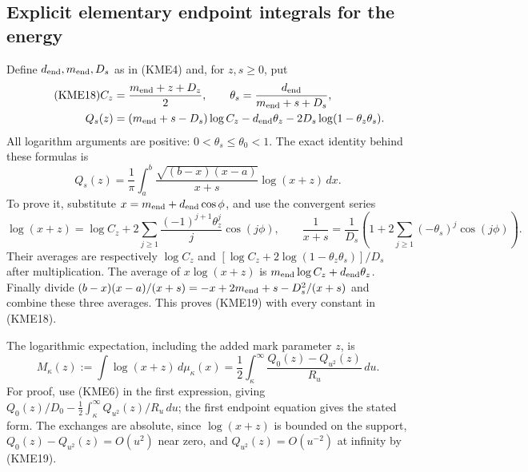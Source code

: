 \documentclass[11pt,a4paper]{article}
\begin{document}
\subsection{Explicit elementary endpoint integrals for the energy}
Define $d_{\rm end},m_{\rm end},D_s$ as in (KME4) and, for $z,s\geq0$, put
\begin{align}\tag{KME18}
 C_z&=\frac{m_{\rm end}+z+D_z}{2},\qquad
 \theta_s=\frac{d_{\rm end}}{m_{\rm end}+s+D_s},\\
 Q_s(z)&=(m_{\rm end}+s-D_s)\log C_z-d_{\rm end}\theta_z
                         -2D_s\log(1-\theta_z\theta_s).
 \notag
\end{align}
All logarithm arguments are positive: $0<\theta_s\leq\theta_0<1$.
The exact identity behind these formulas is
\begin{equation}\tag{KME19}
 Q_s(z)=\frac1\pi\int_a^b
          \frac{\sqrt{(b-x)(x-a)}}{x+s}\log(x+z)\,dx.
\end{equation}
To prove it, substitute $x=m_{\rm end}+d_{\rm end}\cos\phi$, and use the convergent series
\[
 \log(x+z)=\log C_z+
       2\sum_{j\geq1}\frac{(-1)^{j+1}\theta_z^j}{j}\cos(j\phi),
 \qquad
 \frac1{x+s}=\frac1{D_s}
       \left(1+2\sum_{j\geq1}(-\theta_s)^j\cos(j\phi)\right).
\]
Their averages are respectively $\log C_z$ and
$[\log C_z+2\log(1-\theta_z\theta_s)]/D_s$ after multiplication.
The average of $x\log(x+z)$ is $m_{\rm end}\log C_z+d_{\rm end}\theta_z$.
Finally divide
$(b-x)(x-a)/(x+s)=-x+2m_{\rm end}+s-D_s^2/(x+s)$ and combine these three
averages. This proves (KME19) with every constant in (KME18).

The logarithmic expectation, including the added mark parameter $z$, is
\begin{equation}\tag{KME20}
 M_\kappa(z):=\int\log(x+z)\,d\mu_\kappa(x)
       =\frac12\int_\kappa^\infty
                    \frac{Q_0(z)-Q_{u^2}(z)}{R_u}\,du.
\end{equation}
For proof, use (KME6) in the first expression, giving
$Q_0(z)/D_0-\tfrac12\int_\kappa^\infty Q_{u^2}(z)/R_u\,du$;
the first endpoint equation gives the stated form.
The exchanges are absolute, since $\log(x+z)$ is bounded on the
support, $Q_0(z)-Q_{u^2}(z)=O(u^2)$ near zero, and
$Q_{u^2}(z)=O(u^{-2})$ at infinity by (KME19).
\end{document}
